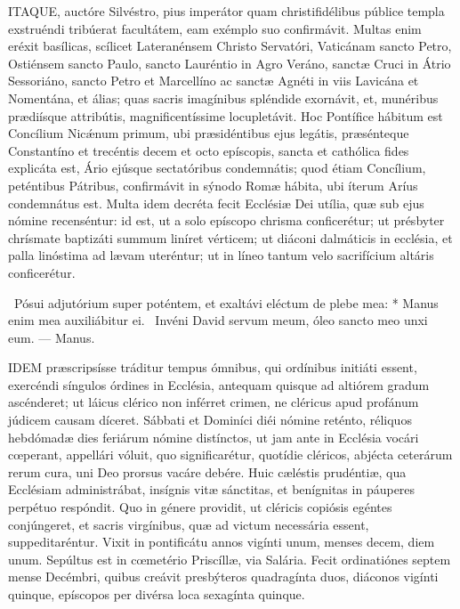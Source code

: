 
\lettrine[lines=2]{I}{TAQUE}, auctóre Silvéstro, pius imperátor quam christifidélibus públice templa exstruéndi tribúerat facultátem, eam exémplo suo confirmávit. Multas enim eréxit basílicas, scílicet Lateranénsem Christo Servatóri, Vaticánam sancto Petro, Ostiénsem sancto Paulo, sancto Lauréntio in Agro Veráno, sanctæ Cruci in Átrio Sessoriáno, sancto Petro et Marcellíno ac sanctæ Agnéti in viis Lavicána et Nomentána, et álias; quas sacris imagínibus spléndide exornávit, et, munéribus prædiísque attribútis, magnificentíssime locupletávit. Hoc Pontífice hábitum est Concílium Nicǽnum primum, ubi præsidéntibus ejus legátis, præsénteque Constantíno et trecéntis decem et octo epíscopis, sancta et cathólica fides explicáta est, Ário ejúsque sectatóribus condemnátis; quod étiam Concílium, peténtibus Pátribus, confirmávit in sýnodo Romæ hábita, ubi íterum Aríus condemnátus est. Multa idem decréta fecit Ecclésiæ Dei utília, quæ sub ejus nómine recenséntur: id est, ut a solo epíscopo chrisma conficerétur; ut présbyter chrísmate baptizáti summum liníret vérticem; ut diáconi dalmáticis in ecclésia, et palla linóstima ad lævam uteréntur; ut in líneo tantum velo sacrifícium altáris conficerétur.

\R\ Pósui adjutórium super poténtem, et exaltávi eléctum de plebe mea: * Manus enim mea auxiliábitur ei. \V\ Invéni David servum meum, óleo sancto meo unxi eum. --- Manus.


\lettrine[lines=2]{I}{DEM} præscripsísse tráditur tempus ómnibus, qui ordínibus initiáti essent, exercéndi síngulos órdines in Ecclésia, antequam quisque ad altiórem gradum ascénderet; ut láicus clérico non inférret crimen, ne cléricus apud profánum júdicem causam díceret. Sábbati et Dominíci diéi nómine reténto, réliquos hebdómadæ dies feriárum nómine distínctos, ut jam ante in Ecclésia vocári cœperant, appellári vóluit, quo significarétur, quotídie cléricos, abjécta ceterárum rerum cura, uni Deo prorsus vacáre debére. Huic cæléstis prudéntiæ, qua Ecclésiam administrábat, insígnis vitæ sánctitas, et benígnitas in páuperes perpétuo respóndit. Quo in génere providit, ut cléricis copiósis egéntes conjúngeret, et sacris virgínibus, quæ ad victum necessária essent, suppeditaréntur. Vixit in pontificátu annos vigínti unum, menses decem, diem unum. Sepúltus est in cœmetério Priscíllæ, via Salária. Fecit ordinatiónes septem mense Decémbri, quibus creávit presbýteros quadragínta duos, diáconos vigínti quinque, epíscopos per divérsa loca sexagínta quinque.

